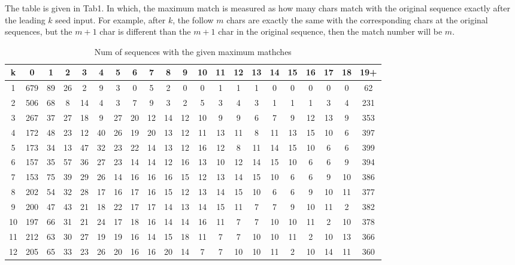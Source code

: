 \documentclass[12pt]{article}
\begin{document}
The table is given in Tab1. In which, the maximum match is measured as
how many chars match with the original sequence exactly after the
leading $k$ seed input. For example, after $k$, the follow $m$ chars are
exactly the same with the corresponding chars at the original
sequences, but the $m+1$ char is different than the $m+1$ char in the
original sequence, then the match number will be $m$.
\begin{table}[h]
    \footnotesize
    \caption{Num of sequences with the given maximum mathches}
    \centering
    \begin{tabular}{*{21}{c}}
        \hline\hline
        k  & 0  & 1   &2   &3   &4   &5   &6   &7   &8   &9   &10  &11  &12  &13  &14  &15  &16 &17  &18 &19+\\
        \hline
        1  &679 & 89 & 26  &2   &9   &3   &0   &5   &2   &0   &0   &1   &1   &1   &0   &0   &0   &0  &0   &62  \\
        2  &506 & 68 & 8   &14  &4   &3   &7   &9   &3   &2   &5   &3   &4   &3   &1   &1   &1   &3  &4   &231 \\
        3  &267 & 37 & 27  &18  &9   &27  &20  &12  &14  &12  &10  &9   &9   &6   &7   &9   &12  &13 &9   &353 \\
        4  &172 & 48 & 23  &12  &40  &26  &19  &20  &13  &12  &11  &13  &11  &8   &11  &13  &15  &10 &6   &397 \\
        5  &173 & 34 & 13  &47  &32  &23  &22  &14  &13  &12  &16  &12  &8   &11  &14  &15  &10  &6  &6   &399 \\
        6  &157 & 35 & 57  &36  &27  &23  &14  &14  &12  &16  &13  &10  &12  &14  &15  &10  &6   &6  &9   &394 \\
        7  &153 & 75 & 39  &29  &26  &14  &16  &16  &16  &15  &12  &13  &14  &15  &10  &6   &6   &9  &10  &386 \\
        8  &202 & 54 & 32  &28  &17  &16  &17  &16  &15  &12  &13  &14  &15  &10  &6   &6   &9   &10 &11  &377 \\
        9  &200 & 47 & 43  &21  &18  &22  &17  &17  &14  &13  &14  &15  &11  &7   &7   &9   &10  &11 &2   &382 \\
        10 &197 & 66 & 31  &21  &24  &17  &18  &16  &14  &14  &16  &11  &7   &7   &10  &10  &11  &2  &10  &378 \\
        11 &212 & 63 & 30  &27  &19  &19  &16  &14  &15  &18  &11  &7   &7   &10  &10  &11  &2   &10 &13  &366 \\
        12 &205 & 65 & 33  &23  &26  &20  &16  &16  &20  &14  &7   &7   &10  &10  &11  &2   &10  &14 &11  &360 \\

\end{tabular}
\end{table}
\end{document}
